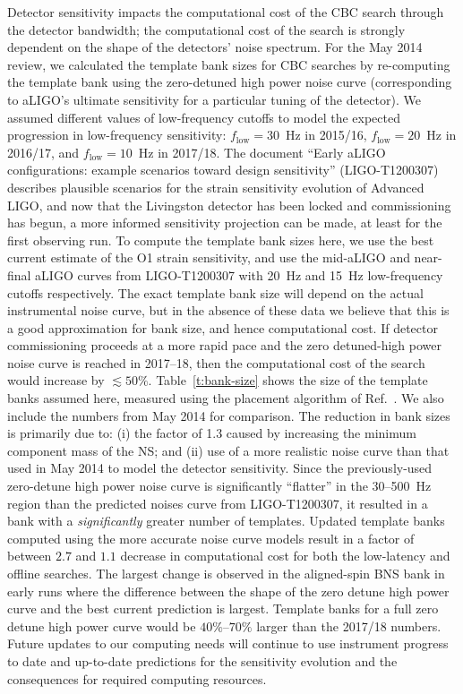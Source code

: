 Detector sensitivity impacts the computational cost of the CBC search through
the detector bandwidth; the computational cost of the search is strongly
dependent on the shape of the detectors' noise spectrum. For the May 2014
review, we calculated the template bank sizes for CBC searches by
re-computing the template bank using the zero-detuned high power noise curve
(corresponding to aLIGO's ultimate sensitivity for a particular tuning of the detector). We assumed different values of
low-frequency cutoffs to model the expected progression in low-frequency
sensitivity: $f_\mathrm{low} = 30$~Hz in 2015/16, $f_\mathrm{low} = 20$~Hz in
2016/17, and $f_\mathrm{low} = 10$~Hz in 2017/18.  The document ``Early aLIGO
configurations: example scenarios toward design
sensitivity'' (LIGO-T1200307) describes plausible scenarios for the
strain sensitivity evolution of Advanced LIGO, and now that the Livingston
detector has been locked and commissioning has begun, a more informed
sensitivity projection can be made, at least for the first observing run.  To
compute the template bank sizes here, we use the best current estimate of the
O1 strain sensitivity, and use the mid-aLIGO and near-final aLIGO curves from
LIGO-T1200307 with 20~Hz and 15~Hz low-frequency cutoffs respectively.
The exact template bank size will depend on the actual instrumental noise
curve, but in the absence of these data we believe that this is a good
approximation for bank size, and hence computational cost. If detector
commissioning proceeds at a more rapid pace and the zero detuned-high power
noise curve is reached in 2017--18, then the computational cost of the search
would increase by $\lesssim 50\%$. Table~\ref{t:bank-size} shows the size of
the template banks assumed here, measured using the placement algorithm of
Ref.~\cite{Brown:2012qf}. We also include the numbers from May 2014 for
comparison. The reduction in bank sizes is primarily due to: (i) the factor of 1.3 caused
by increasing the minimum component mass of the NS; and (ii) use of a more
realistic 
noise curve than that used in May 2014 to model the detector sensitivity.
Since the previously-used zero-detune high power noise curve is significantly
``flatter'' in the 30--500~Hz region than the predicted noises curve from
LIGO-T1200307, it resulted in a bank with a
\textit{significantly} greater number of templates. Updated template banks computed using the more accurate noise curve models
result in a factor of
between $2.7$ and $1.1$ decrease in computational cost for both the low-latency and offline
searches. The largest change is observed in the aligned-spin BNS bank in early runs where the
difference between the shape of the zero detune high power curve and the best
current
prediction is largest. Template banks for a full zero detune high power curve
would be $40\%$--$70\%$ larger than the 2017/18 numbers. Future updates to our computing needs will continue to use instrument progress to date and up-to-date predictions for the sensitivity evolution and the consequences for required computing resources.


